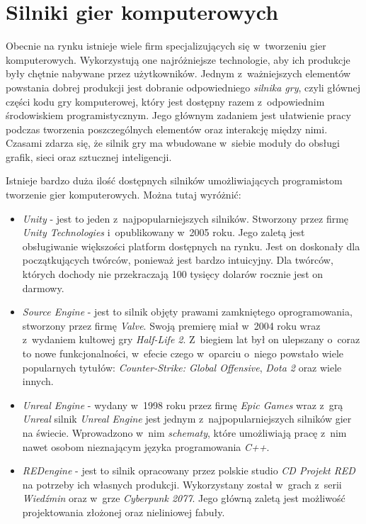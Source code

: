 \documentclass[12pt,a4paper,oneside]{book}
\theoremstyle{definition}
\numberwithin{equation}{chapter}
\begin{document}
\section{Silniki gier komputerowych}
\par Obecnie na rynku istnieje wiele firm specjalizujących się w~tworzeniu gier komputerowych. Wykorzystują one najróżniejsze technologie, aby ich produkcje były chętnie nabywane przez użytkowników. Jednym z~ważniejszych elementów powstania dobrej produkcji jest dobranie odpowiedniego \textit{silnika gry}, czyli głównej części kodu gry komputerowej, który jest dostępny razem z~odpowiednim środowiskiem programistycznym. Jego głównym zadaniem jest ułatwienie pracy podczas tworzenia poszczególnych elementów oraz interakcję między nimi. Czasami zdarza się, że silnik gry ma wbudowane w~siebie moduły do obsługi grafik, sieci oraz sztucznej inteligencji.
\par Istnieje bardzo duża ilość dostępnych silników umożliwiających programistom tworzenie gier komputerowych. Można tutaj wyróżnić:
\begin{itemize}
    \item \textit{Unity} - jest to jeden z~najpopularniejszych silników. Stworzony przez firmę \textit{Unity Technologies} i~opublikowany w~2005 roku. Jego zaletą jest obsługiwanie większości platform dostępnych na rynku. Jest on doskonały dla początkujących twórców, ponieważ jest bardzo intuicyjny. Dla twórców, których dochody nie przekraczają 100 tysięcy dolarów rocznie jest on darmowy.
    \item \textit{Source Engine} - jest to silnik objęty prawami zamkniętego oprogramowania, stworzony przez firmę \textit{Valve}. Swoją premierę miał w~2004 roku wraz z~wydaniem kultowej gry \textit{Half-Life 2}. Z~biegiem lat był on ulepszany o~coraz to nowe funkcjonalności, w~efecie czego w~oparciu o~niego powstało wiele popularnych tytułów: \textit{Counter-Strike: Global Offensive}, \textit{Dota 2} oraz wiele innych.
    \item \textit{Unreal Engine} - wydany w~1998 roku przez firmę \textit{Epic Games} wraz z~grą \textit{Unreal} silnik \textit{Unreal Engine} jest jednym z~najpopularniejszych silników gier na świecie. Wprowadzono w~nim \textit{schematy}, które umożliwiają pracę z~nim nawet osobom nieznającym języka programowania \textit{C++}.
    \item \textit{REDengine} - jest to silnik opracowany przez polskie studio \textit{CD Projekt RED} na potrzeby ich własnych produkcji. Wykorzystany został w~grach z~serii \textit{Wiedźmin} oraz w~grze \textit{Cyberpunk 2077}. Jego główną zaletą jest możliwość projektowania złożonej oraz nieliniowej fabuły.
\end{itemize}
\end{document}

